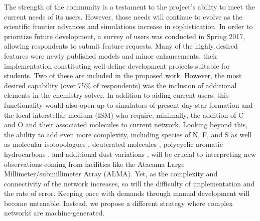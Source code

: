 The strength of the \grackle{} community is a testament to the
project's ability to meet the current needs of its users.  However,
those needs will continue to evolve as the scientific frontier
advances and simulations increase in sophistication.  In order to
prioritize future development, a survey of \grackle{} users was
conducted in Spring 2017, allowing respondents to submit feature
requests.  Many of the highly desired features were newly published
models and minor enhancements, their implementation constituting
well-define development projects suitable for students.  Two of these
are included in the proposed work.  However, the most desired
capability (over 75\% of respondents) was the inclusion of additional
elements in the chemistry solver.  In addition to aiding current
users, this functionality would also open \grackle{} up to simulators
of present-day star formation and the local interstellar medium (ISM)
who require, minimally, the addition of C and O and their
associated molecules to  current network.  Looking beyond
this, the ability to add even more complexity, including species of
N, F, and S as well as molecular isotopologues
\citep{2008ApJ...679..481P}, deuterated molecules
\citep{2005ApJ...619..379C}, polycyclic aromatic hydrocarbons
\citep[PAHs,][]{2016JPhCS.728f2005G}, and
additional dust variations \citep{2013RvMP...85.1021T}, will be crucial
to interpreting new observations coming from facilities like the
Atacama Large Millimeter/submillimeter Array (ALMA).
Yet, as the complexity and connectivity of the network increases, so
will the difficulty of implementation and the rate of error.  Keeping
pace with demands through manual development will become
untenable.  Instead, we propose a different strategy where complex
networks are machine-generated.


